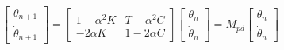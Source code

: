 \begin{align}
\label{eq:PoincareMapPD}
\begin{bmatrix}
\theta_{n+1}  \\
\dot \theta_{n+1}
\end{bmatrix} = \begin{bmatrix}
1-\alpha^2 K & T-\alpha^2 C \\
-2\alpha K & 1-2\alpha C
\end{bmatrix}\begin{bmatrix}
 \theta_n  \\
\dot \theta_n 
\end{bmatrix} = M_{pd}
\begin{bmatrix}
 \theta_n  \\
\dot \theta_n 
\end{bmatrix}
\end{align}







\pagebreak



















